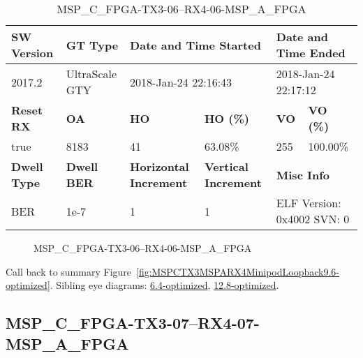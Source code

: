 \begin{table}[h]
\centering
\caption{MSP\_C\_FPGA-TX3-06--RX4-06-MSP\_A\_FPGA}
\label{tab:MSPCFPGATX306RX406MSPAFPGA9.6-optimized}
\begin{tabular}{@{}|l|l|l|l|l|l|@{}}
\toprule
\textbf{SW Version}                & \textbf{GT Type}   & \multicolumn{2}{l|}{\textbf{Date and Time Started}}            & \multicolumn{2}{l|}{\textbf{Date and Time Ended}}        \\ \midrule
2017.2                       & UltraScale GTY          & \multicolumn{2}{l|}{2018-Jan-24 22:16:43}                   & \multicolumn{2}{l|}{2018-Jan-24 22:17:12}               \\ \midrule
\textbf{Reset RX}                  & \textbf{OA} & \textbf{HO}   & \textbf{HO (\%)} & \textbf{VO} & \textbf{VO (\%)} \\ \midrule
true & 8183        & 41          & 63.08\%        & 255        & 100.00\%       \\ \midrule
\textbf{Dwell Type}                & \textbf{Dwell BER} & \textbf{Horizontal Increment} & \textbf{Vertical Increment}    & \multicolumn{2}{l|}{\textbf{Misc Info}}                  \\ \midrule
BER                            & 1e-7        & 1        & 1           & \multicolumn{2}{l|}{ELF Version: 0x4002 SVN: 0}                         \\ \bottomrule
\end{tabular}
\end{table}

\begin{figure}[h]
\caption{MSP\_C\_FPGA-TX3-06--RX4-06-MSP\_A\_FPGA} \label{fig:MSPCFPGATX306RX406MSPAFPGA9.6-optimized}
\end{figure}

Call back to summary Figure~\ref{fig:MSPCTX3MSPARX4MinipodLoopback9.6-optimized}.
Sibling eye diagrams: \hyperref[sec:MSPCFPGATX306RX406MSPAFPGA6.4-optimized]{6.4-optimized}, \hyperref[sec:MSPCFPGATX306RX406MSPAFPGA12.8-optimized]{12.8-optimized}.

\clearpage
\newpage


\subsection{MSP\_C\_FPGA-TX3-07--RX4-07-MSP\_A\_FPGA}\label{sec:MSPCFPGATX307RX407MSPAFPGA9.6-optimized}

